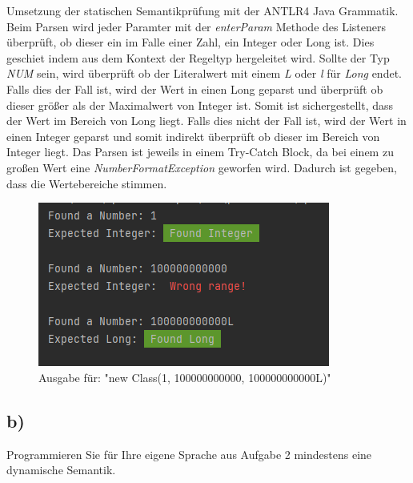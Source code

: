 Umsetzung der statischen Semantikprüfung mit der ANTLR4 Java Grammatik.
\newline
Beim Parsen wird jeder Paramter mit der \textit{enterParam} Methode des Listeners überprüft, ob dieser ein im Falle einer Zahl, ein Integer oder Long ist.
Dies geschiet indem aus dem Kontext der Regeltyp hergeleitet wird.
Sollte der Typ \textit{NUM} sein, wird überprüft ob der Literalwert mit einem \textit{L} oder \textit{l} für \textit{Long} endet.
Falls dies der Fall ist, wird der Wert in einen Long geparst und überprüft ob dieser größer als der Maximalwert von Integer ist.
Somit ist sichergestellt, dass der Wert im Bereich von Long liegt.
Falls dies nicht der Fall ist, wird der Wert in einen Integer geparst und somit indirekt überprüft ob dieser im Bereich von Integer liegt.
Das Parsen ist jeweils in einem Try-Catch Block, da bei einem zu großen Wert eine \textit{NumberFormatException} geworfen wird.
Dadurch ist gegeben, dass die Wertebereiche stimmen.
\newline
\newline
\newline
\newline
\begin{figure}[h]
	\includegraphics[width=\textwidth]{media/Aufgabe3a_static_output}
	\caption{Ausgabe für: "new Class(1, 100000000000, 100000000000L)"}
	\label{img:Aufgabe3a_output}
\end{figure}
\newline

\subsection*{b)}
Programmieren Sie für Ihre eigene Sprache aus Aufgabe 2 mindestens eine dynamische Semantik.

